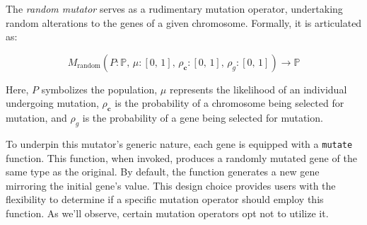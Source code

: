 \begin{definition}
  The \emph{random mutator} serves as a rudimentary mutation operator, undertaking random alterations to the genes of a 
  given chromosome. Formally, it is articulated as:

  \begin{equation}
    M_\mathrm{random}(P: \mathbb{P},\, \mu: [0,\, 1],\, \rho_\textbf{c}: [0,\, 1],\, \rho_g: [0,\, 1]) \to \mathbb{P}
  \end{equation}

  Here, \(P\) symbolizes the population, \(\mu\) represents the likelihood of an individual undergoing mutation, 
  \(\rho_\textbf{c}\) is the probability of a chromosome being selected for mutation, and \(\rho_g\) is the probability 
  of a gene being selected for mutation.
\end{definition}

\begin{remark}
  To underpin this mutator's generic nature, each gene is equipped with a \texttt{mutate} function. This function, when invoked, produces a randomly mutated gene of the same type as the original. By default, the function generates a new 
  gene mirroring the initial gene's value. This design choice provides users with the flexibility to determine if a 
  specific mutation operator should employ this function. As we'll observe, certain mutation operators opt not to 
  utilize it.
\end{remark}
